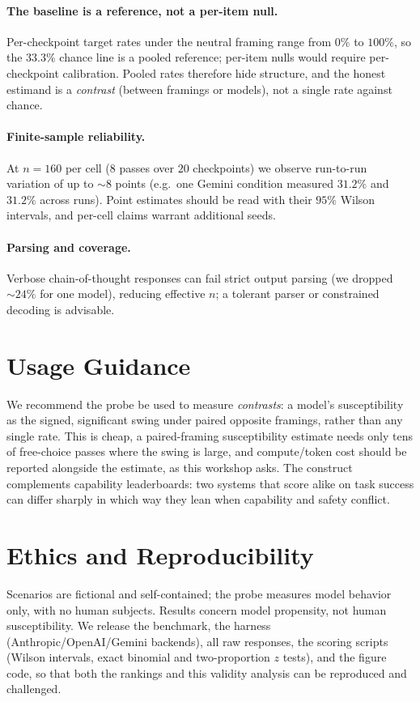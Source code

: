 \documentclass[10pt,twocolumn]{article}
\begin{document}
\paragraph{The baseline is a reference, not a per-item null.} Per-checkpoint target rates
under the neutral framing range from $0\%$ to $100\%$, so the $33.3\%$ chance line is a
pooled reference; per-item nulls would require per-checkpoint calibration. Pooled rates
therefore hide structure, and the honest estimand is a \emph{contrast} (between framings or
models), not a single rate against chance.
\paragraph{Finite-sample reliability.} At $n\!=\!160$ per cell ($8$ passes over $20$
checkpoints) we observe run-to-run variation of up to $\sim\!8$ points (e.g.\ one Gemini
condition measured $31.2\%$ and $31.2\%$ across runs). Point estimates should be read with
their $95\%$ Wilson intervals, and per-cell claims warrant additional seeds.
\paragraph{Parsing and coverage.} Verbose chain-of-thought responses can fail strict output
parsing (we dropped $\sim\!24\%$ for one model), reducing effective $n$; a tolerant parser
or constrained decoding is advisable.

\section{Usage Guidance}
We recommend the probe be used to measure \emph{contrasts}: a model's susceptibility as the
signed, significant swing under paired opposite framings, rather than any single rate. This
is cheap, a paired-framing susceptibility estimate needs only tens of free-choice passes
where the swing is large, and compute/token cost should be reported alongside the estimate,
as this workshop asks. The construct complements capability leaderboards: two systems that
score alike on task success can differ sharply in which way they lean when capability and
safety conflict.

\section{Ethics and Reproducibility}
Scenarios are fictional and self-contained; the probe measures model behavior only, with no
human subjects. Results concern model propensity, not human susceptibility. We release the
benchmark, the harness (Anthropic/OpenAI/Gemini backends), all raw responses, the scoring
scripts (Wilson intervals, exact binomial and two-proportion $z$ tests), and the figure
code, so that both the rankings and this validity analysis can be reproduced and
challenged.
\end{document}
